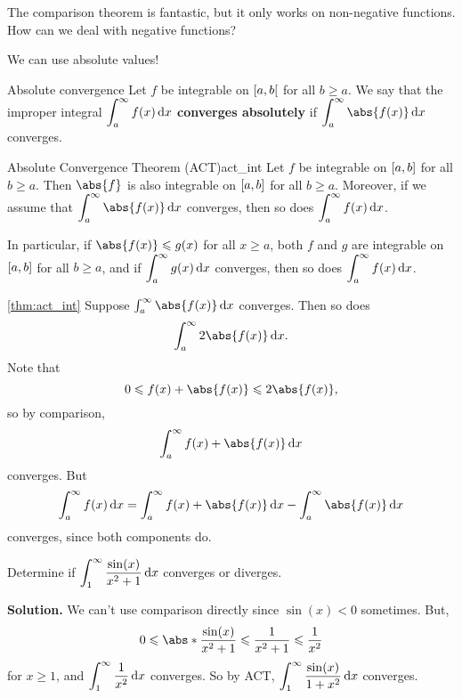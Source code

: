 The comparison theorem is fantastic, but it only works on non-negative functions. How
can we deal with negative functions?

We can use absolute values!

\begin{Definition}{Absolute convergence}{}
    Let $ f $ be integrable on $ \interval[open right]{a}{b} $ for all $ b\geqslant a $.
    We say that the improper integral $ \displaystyle \int_{a}^{\infty} f(x)\odif{x} $
    \textbf{converges absolutely} if
    $ \displaystyle \int_{a}^{\infty} \abs{f(x)}\odif{x} $
    converges.
\end{Definition}

\begin{Theorem}{Absolute Convergence Theorem (ACT)}{act_int}
    Let $ f $ be integrable on $ \interval{a}{b} $ for all $ b\geqslant a $.
    Then $ \abs{f} $ is also integrable on $ \interval{a}{b} $ for all $ b\geqslant a $.
    Moreover, if we assume that
    $ \displaystyle \int_{a}^{\infty} \abs{f(x)}\odif{x} $
    converges, then so does
    $ \displaystyle  \int_{a}^{\infty} f(x)\odif{x} $.

    In particular, if $ \abs{f(x)}\leqslant g(x) $ for all $ x\geqslant a $,
    both $ f $ and $ g $ are integrable on $ \interval{a}{b} $ for all $ b\geqslant a $,
    and if $ \displaystyle \int_{a}^{\infty} g(x)\odif{x}  $ converges, then so does
    $ \displaystyle \int_{a}^{\infty} f(x)\odif{x} $.
\end{Theorem}

\begin{Proof}{\ref{thm:act_int}}{}
    Suppose $ \int_{a}^{\infty} \abs{f(x)}\odif{x} $ converges. Then so does
    \[ \int_{a}^{\infty} 2\abs{f(x)}\odif{x}. \]
    Note that
    \[ 0\leqslant f(x)+\abs{f(x)}\leqslant 2\abs{f(x)}, \]
    so by comparison,
    \[ \int_{a}^{\infty} f(x)+\abs{f(x)}\odif{x} \]
    converges. But
    \[ \int_{a}^{\infty} f(x)\odif{x} =\int_{a}^{\infty} f(x)+\abs{f(x)}\odif{x} -
    \int_{a}^{\infty} \abs{f(x)}\odif{x}  \]
    converges, since both components do.
\end{Proof}

\begin{Example}{}{}
    Determine if $ \displaystyle \int_{1}^{\infty} \frac{\sin(x)}{x^2+1} \odif{x} $
    converges or diverges.

    \textbf{Solution.}
    We can't use comparison directly since $ \sin(x)<0 $ sometimes. But,
    \[ \displaystyle  0\leqslant \abs*{\frac{\sin(x)}{x^2+1} }\leqslant \frac{1}{x^2+1}
    \leqslant \frac{1}{x^2} \]
    for $ x\geqslant 1 $, and $ \displaystyle \int_{1}^{\infty} \frac{1}{x^2} \odif{x}  $ converges. So by
    ACT, $ \displaystyle \int_{1}^{\infty} \frac{\sin(x)}{1+x^2} \odif{x}  $ converges.
\end{Example}

